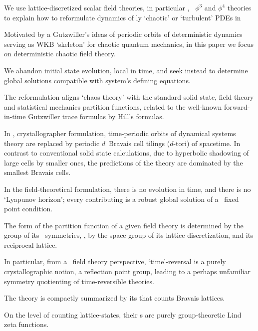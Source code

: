 

We use lattice-discretized
scalar field theories, in particular \catlatt, \Henon\
{$\phi^3$} and {$\phi^4$} theories
to explain how to reformulate dynamics of {\spt}ly `chaotic' or
`turbulent' PDEs in

Motivated by a Gutzwiller's ideas of periodic orbits of
deterministic dynamics serving as WKB
`skeleton' for chaotic quantum mechanics, in this paper we
focus on deterministic chaotic field theory.

We abandon initial state evolution, local in time, and seek instead to
determine global solutions compatible with system's defining equations.

The reformulation aligns `chaos theory' with the standard solid state,
field theory and statistical mechanics partition functions, related to
the well-known forward-in-time Gutzwiller trace formulas by Hill's
formulas.

In \spt, crystallographer formulation, time-periodic orbits of
dynamical systems theory are replaced by periodic $d$\dmn\ {Bravais cell}
tilings ($d$-tori) of spacetime. In contrast to conventional
solid state calculations, due to hyperbolic shadowing of large
cells by smaller ones, the predictions of the theory are dominated by
the smallest Bravais cells.


In the field-theoretical formulation, there is no evolution in time, and
there is no `Lyapunov horizon'; every contributing {\em \lattstate} is a
robust global solution of a \spt\ fixed point condition.

The form of the partition function of a
given field theory is determined by the group of its \spt\ symmetries, \ie,
by the space group of its lattice discretization,  and its reciprocal
lattice.

In particular, from a \spt\ field theory perspective, `time'-reversal is
a purely crystallographic notion, a reflection point group, leading to a
perhaps unfamiliar symmetry quotienting of time-reversible theories.

The theory is compactly summarized by its {\tzeta}
that counts Bravais lattices.

On the level of counting lattice-states, their {\tzeta}s are purely
group-theoretic Lind zeta functions.
